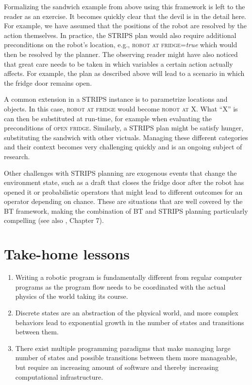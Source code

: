 Formalizing the sandwich example from above using this framework is left to the reader as an exercise. It becomes quickly clear that the devil is in the detail here. For example, we have assumed that the positions of the robot are resolved by the action themselves. In practice, the STRIPS plan would also require additional preconditions on the robot's location, e.g., \textsc{robot at fridge}=\emph{true} which would then be resolved by the planner. The observing reader might have also noticed that great care needs to be taken in which variables a certain action actually affects. For example, the plan as described above will lead to a scenario in which the fridge door remains open. 

A common extension in a STRIPS instance is to parametrize locations and objects. In this case, \textsc{robot at fridge} would become \textsc{robot at X}. What ``X'' is can then be substituted at run-time, for example when evaluating the preconditions of \textsc{open fridge}. Similarly, a STRIPS plan might be satisfy hunger, substituting the sandwich with other victuals. Managing these different categories and their context becomes very challenging quickly and is an ongoing subject of research. 

Other challenges with STRIPS planning are exogenous events that change the environment state, such as a draft that closes the fridge door after the robot has opened it or probabilistic operators that might lead to different outcomes for an operator depending on chance. These are situations that are well covered by the BT framework, making the combination of BT and STRIPS planning particularly compelling (see also \cite{colledanchise2018behavior}, Chapter 7). 


\section*{Take-home lessons}
\begin{enumerate}
\item Writing a robotic program is fundamentally different from regular computer programs as the program flow needs to be coordinated with the actual physics of the world taking its course.
\item Discrete states are an abstraction of the physical world, and more complex behaviors lead to exponential growth in the number of states and transitions between them.
\item There exist multiple programming paradigms that make managing large number of states and possible transitions between them more manageable, but require an increasing amount of software and thereby increasing computational infrastructure.
\end{enumerate}

